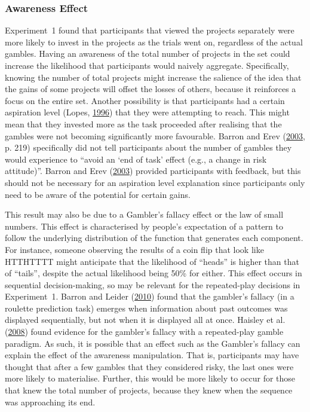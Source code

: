 \documentclass[
  english,
  man, donotrepeattitle,floatsintext]{apa7}
\theoremstyle{definition}
\theoremstyle{definition}
\theoremstyle{definition}
\theoremstyle{definition}
\theoremstyle{remark}
\begin{document}
\hypertarget{awareness-effect}{%
\subsubsection{Awareness Effect}\label{awareness-effect}}

Experiment~1 found that participants that viewed the projects separately were
more likely to invest in the projects as the trials went on, regardless of the
actual gambles. Having an awareness of the total number of projects in the set
could increase the likelihood that participants would naively aggregate.
Specifically, knowing the number of total projects might increase the salience
of the idea that the gains of some projects will offset the losses of others,
because it reinforces a focus on the entire set. Another possibility is that
participants had a certain aspiration level (Lopes, \protect\hyperlink{ref-lopes1996}{1996}) that they were
attempting to reach. This might mean that they invested more as the task
proceeded after realising that the gambles were not becoming significantly more
favourable. Barron and Erev (\protect\hyperlink{ref-barron2003}{2003}, p. 219) specifically did not tell participants about
the number of gambles they would experience to ``avoid an `end of task' effect
(e.g., a change in risk attitude)''. Barron and Erev (\protect\hyperlink{ref-barron2003}{2003}) provided participants with
feedback, but this should not be necessary for an aspiration level explanation
since participants only need to be aware of the potential for certain gains.

This result may also be due to a Gambler's fallacy effect or the law of small
numbers. This effect is characterised by people's expectation of a pattern to
follow the underlying distribution of the function that generates each
component. For instance, someone observing the results of a coin flip that look
like HTTHTTTT might anticipate that the likelihood of ``heads'' is higher than
that of ``tails'', despite the actual likelihood being 50\% for either. This effect
occurs in sequential decision-making, so may be relevant for the repeated-play
decisions in Experiment~1. Barron and Leider (\protect\hyperlink{ref-barron2010}{2010}) found that the gambler's fallacy (in a
roulette prediction task) emerges when information about past outcomes was
displayed sequentially, but not when it is displayed all at once. Haisley et al. (\protect\hyperlink{ref-haisley2008}{2008})
found evidence for the gambler's fallacy with a repeated-play gamble paradigm.
As such, it is possible that an effect such as the Gambler's fallacy can explain
the effect of the awareness manipulation. That is, participants may have thought
that after a few gambles that they considered risky, the last ones were more
likely to materialise. Further, this would be more likely to occur for those
that knew the total number of projects, because they knew when the sequence was
approaching its end.
\end{document}
